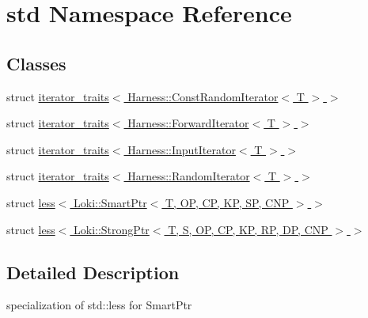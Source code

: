 \hypertarget{namespacestd}{}\section{std Namespace Reference}
\label{namespacestd}
\subsection*{Classes}
\begin{DoxyCompactItemize}
\item 
struct \hyperlink{structstd_1_1iterator__traits_3_01Harness_1_1ConstRandomIterator_3_01T_01_4_01_4}{iterator\+\_\+traits$<$ Harness\+::\+Const\+Random\+Iterator$<$ T $>$ $>$}
\item 
struct \hyperlink{structstd_1_1iterator__traits_3_01Harness_1_1ForwardIterator_3_01T_01_4_01_4}{iterator\+\_\+traits$<$ Harness\+::\+Forward\+Iterator$<$ T $>$ $>$}
\item 
struct \hyperlink{structstd_1_1iterator__traits_3_01Harness_1_1InputIterator_3_01T_01_4_01_4}{iterator\+\_\+traits$<$ Harness\+::\+Input\+Iterator$<$ T $>$ $>$}
\item 
struct \hyperlink{structstd_1_1iterator__traits_3_01Harness_1_1RandomIterator_3_01T_01_4_01_4}{iterator\+\_\+traits$<$ Harness\+::\+Random\+Iterator$<$ T $>$ $>$}
\item 
struct \hyperlink{structstd_1_1less_3_01Loki_1_1SmartPtr_3_01T_00_01OP_00_01CP_00_01KP_00_01SP_00_01CNP_01_4_01_4}{less$<$ Loki\+::\+Smart\+Ptr$<$ T, O\+P, C\+P, K\+P, S\+P, C\+N\+P $>$ $>$}
\item 
struct \hyperlink{structstd_1_1less_3_01Loki_1_1StrongPtr_3_01T_00_01S_00_01OP_00_01CP_00_01KP_00_01RP_00_01DP_00_01CNP_01_4_01_4}{less$<$ Loki\+::\+Strong\+Ptr$<$ T, S, O\+P, C\+P, K\+P, R\+P, D\+P, C\+N\+P $>$ $>$}
\end{DoxyCompactItemize}


\subsection{Detailed Description}
specialization of std\+::less for Smart\+Ptr 